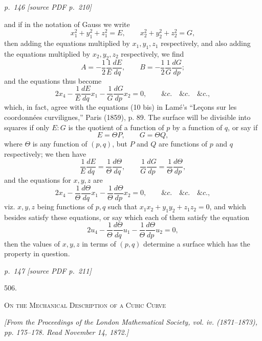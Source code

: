 \documentclass[11pt,a4paper]{article}
\newcommand{\sourcepage}[2]{%
  \bigskip
  \noindent\textit{p.~#1 [source PDF p.~#2]}%
  \par\smallskip
}
\newcommand{\paper}[2]{%
  \begin{center}
    {\Large #1.}\par\vspace{0.75em}
    {\large\scshape #2}
  \end{center}
}
\newcommand{\pubnote}[1]{%
  \begin{center}\small\itshape #1\end{center}
}
\begin{document}
\sourcepage{146}{210}

and if in the notation of Gauss we write
\[
x_1^2+y_1^2+z_1^2=E,\qquad
x_2^2+y_2^2+z_2^2=G,
\]
then adding the equations multiplied by \(x_1,y_1,z_1\) respectively, and also
adding the equations multiplied by \(x_2,y_2,z_2\) respectively, we find
\[
A=-\frac12\frac1E\frac{dE}{dq},\qquad
B=-\frac12\frac1G\frac{dG}{dp};
\]
and the equations thus become
\[
2x_4-\frac1E\frac{dE}{dq}x_1-\frac1G\frac{dG}{dp}x_2=0,
\qquad \&c.\quad \&c.\quad \&c.,
\]
which, in fact, agree with the equations (10 bis) in Lam\'e's
``Le\c cons sur les coordonn\'ees curvilignes,'' Paris (1859), p. 89. The surface will
be divisible into squares if only \(E:G\) is the quotient of a function of \(p\) by a
function of \(q\), or say if
\[
E=\Theta P,\qquad G=\Theta Q,
\]
where \(\Theta\) is any function of \((p,q)\), but \(P\) and \(Q\) are functions of \(p\)
and \(q\) respectively; we then have
\[
\frac1E\frac{dE}{dq}=\frac1\Theta\frac{d\Theta}{dq},\qquad
\frac1G\frac{dG}{dp}=\frac1\Theta\frac{d\Theta}{dp},
\]
and the equations for \(x,y,z\) are
\[
2x_4-\frac1\Theta\frac{d\Theta}{dq}x_1-\frac1\Theta\frac{d\Theta}{dp}x_2=0,
\qquad \&c.\quad \&c.\quad \&c.,
\]
viz. \(x,y,z\) being functions of \(p,q\) such that
\(x_1x_2+y_1y_2+z_1z_2=0\), and which besides satisfy these equations, or say which
each of them satisfy the equation
\[
2u_4-\frac1\Theta\frac{d\Theta}{dq}u_1-\frac1\Theta\frac{d\Theta}{dp}u_2=0,
\]
then the values of \(x,y,z\) in terms of \((p,q)\) determine a surface which has the
property in question.

\sourcepage{147}{211}
\paper{506}{On the Mechanical Description of a Cubic Curve}
\pubnote{[From the Proceedings of the London Mathematical Society, vol. iv. (1871--1873), pp. 175--178. Read November 14, 1872.]}
\end{document}
